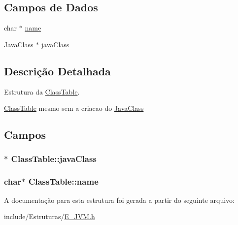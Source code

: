 \subsection*{Campos de Dados}
\begin{DoxyCompactItemize}
\item 
char $\ast$ \hyperlink{struct_class_table_acd5b84c549aa0dc5b79750c0fa8525be}{name}
\item 
\hyperlink{struct_java_class}{Java\+Class} $\ast$ \hyperlink{struct_class_table_a32e6ffa41523c58f4f9ac382399832dc}{java\+Class}
\end{DoxyCompactItemize}


\subsection{Descrição Detalhada}
Estrutura da \hyperlink{struct_class_table}{Class\+Table}. 

\hyperlink{struct_class_table}{Class\+Table} mesmo sem a criacao do \hyperlink{struct_java_class}{Java\+Class} 

\subsection{Campos}
\hypertarget{struct_class_table_a32e6ffa41523c58f4f9ac382399832dc}{}
\subsubsection[{java\+Class}]{$\ast$ Class\+Table\+::java\+Class}\label{struct_class_table_a32e6ffa41523c58f4f9ac382399832dc}
\hypertarget{struct_class_table_acd5b84c549aa0dc5b79750c0fa8525be}{}
\subsubsection[{name}]{\setlength{\rightskip}{0pt plus 5cm}char$\ast$ Class\+Table\+::name}\label{struct_class_table_acd5b84c549aa0dc5b79750c0fa8525be}


A documentação para esta estrutura foi gerada a partir do seguinte arquivo\+:\begin{DoxyCompactItemize}
\item 
include/\+Estruturas/\hyperlink{_e___j_v_m_8h}{E\+\_\+\+J\+V\+M.\+h}\end{DoxyCompactItemize}
